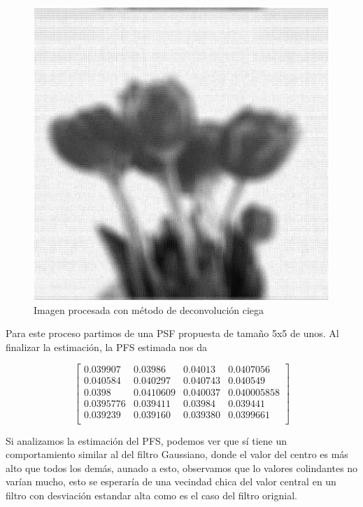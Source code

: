 \documentclass[eng]{ajceam-class}
\begin{document}
\begin{figure}[!h] 
 \centering
 \includegraphics[width=.7\columnwidth]{flores_deconv_blind.png} 
 \caption{Imagen procesada con método de deconvolución ciega} \label{fig-1}
\end{figure}

Para este proceso partimos de una PSF propuesta de tamaño 5x5 de unos. Al finalizar la estimación, la PFS estimada nos da

\begin{equation}
\begin{bmatrix}
       0.039907 & 0.03986 &  0.04013  & 0.0407056\\
   0.040584  &  0.040297   & 0.040743   & 0.040549\\
       0.0398  & 0.0410609 &  0.040037 &  0.040005858\\
   0.0395776   & 0.039411 &  0.03984 &  0.039441 \\
   0.039239  & 0.039160   &0.039380  & 0.0399661\\


\end{bmatrix}
\end{equation}

Si analizamos la estimación del PFS, podemos ver que sí tiene un comportamiento similar al del filtro Gaussiano, donde el valor del centro es más alto que todos los demás, aunado a esto, observamos que lo valores colindantes no varían mucho, esto se esperaría de una vecindad chica del valor central en un filtro con desviación estandar alta como es el caso del filtro orignial. 
\end{document}
